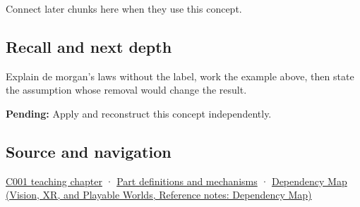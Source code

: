 Connect later chunks here when they use this concept.

\subsection{Recall and next depth}\label{appendix-9079d3659da4-recall-and-next-depth}

Explain de morgan's laws without the label, work the example above, then state the assumption whose removal would change the result.

\textbf{Pending:} Apply and reconstruct this concept independently.

\subsection{Source and navigation}\label{appendix-9079d3659da4-source-and-navigation}

\hyperref[01-foundations-i-ch001-from-a-signal-to-an-interpretation]{C001 teaching chapter} · \hyperref[appendix-fd090d982a15]{Part definitions and mechanisms} · \href{../07-Vision-XR-and-Playable-Worlds/main.pdf\#nameddest=appendix-4ad47bdd269a}{Dependency Map (Vision, XR, and Playable Worlds, Reference notes: Dependency Map)}
